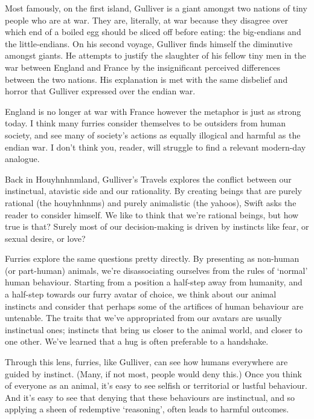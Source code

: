 Most famously, on the first island, Gulliver is a giant amongst two nations of tiny people who are at war. They are, literally, at war because they disagree over which end of a boiled egg should be sliced off before eating: the big-endians and the little-endians. On his second voyage, Gulliver finds himself the diminutive amongst giants. He attempts to justify the slaughter of his fellow tiny men in the war between England and France by the insignificant perceived differences between the two nations. His explanation is met with the same disbelief and horror that Gulliver expressed over the endian war.

England is no longer at war with France however the metaphor is just as strong today. I think many furries consider themselves to be outsiders from human society, and see many of society's actions as equally illogical and harmful as the endian war. I don't think you, reader, will struggle to find a relevant modern-day analogue.

Back in Houyhnhnmland, Gulliver's Travels explores the conflict between our instinctual, atavistic side and our rationality. By creating beings that are purely rational (the houyhnhnms) and purely animalistic (the yahoos), Swift asks the reader to consider himself. We like to think that we're rational beings, but how true is that? Surely most of our decision-making is driven by instincts like fear, or sexual desire, or love?

Furries explore the same questions pretty directly. By presenting as non-human (or part-human) animals, we're disassociating ourselves from the rules of `normal' human behaviour. Starting from a position a half-step away from humanity, and a half-step towards our furry avatar of choice, we think about our animal instincts and consider that perhaps some of the artifices of human behaviour are untenable. The traits that we've appropriated from our avatars are usually instinctual ones; instincts that bring us closer to the animal world, and closer to one other. We've learned that a hug is often preferable to a handshake.

Through this lens, furries, like Gulliver, can see how humans everywhere are guided by instinct. (Many, if not most, people would deny this.) Once you think of everyone as an animal, it's easy to see selfish or territorial or lustful behaviour. And it's easy to see that denying that these behaviours are instinctual, and so applying a sheen of redemptive `reasoning', often leads to harmful outcomes.

